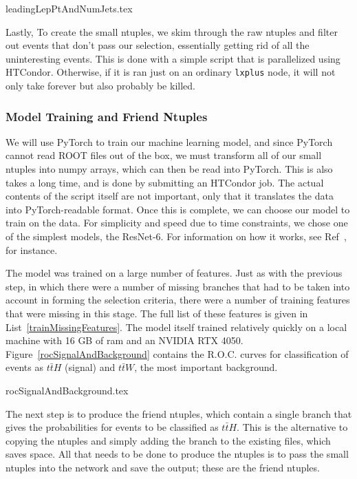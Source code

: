     {leadingLepPtAndNumJets.tex}

    Lastly, To create the small ntuples, we skim through the raw ntuples and filter out events that don't pass our selection, essentially getting rid of all the uninteresting events. This is done with a simple script that is parallelized using HTCondor. Otherwise, if it is ran just on an ordinary \texttt{lxplus} node, it will not only take forever but also probably be killed.


\subsubsection{Model Training and Friend Ntuples}
    We will use PyTorch to train our machine learning model, and since PyTorch cannot read ROOT files out of the box, we must transform all of our small ntuples into numpy arrays, which can then be read into PyTorch. This is also takes a long time, and is done by submitting an HTCondor job. The actual contents of the script itself are not important, only that it translates the data into PyTorch-readable format. Once this is complete, we can choose our model to train on the data. For simplicity and speed due to time constraints, we chose one of the simplest models, the ResNet-6. For information on how it works, see Ref~\cite{resnet}, for instance.

    The model was trained on a large number of features. Just as with the previous step, in which there were a number of missing branches that had to be taken into account in forming the selection criteria, there were a number of training features that were missing in this stage. The full list of these features is given in List~\ref{trainMissingFeatures}. The model itself trained relatively quickly on a local machine with 16 GB of ram and an NVIDIA RTX 4050. Figure~\ref{rocSignalAndBackground} contains the R.O.C. curves for classification of events as $t\bar{t}H$ (signal) and $t\bar{t}W$, the most important background.

    {rocSignalAndBackground.tex}

    The next step is to produce the friend ntuples, which contain a single branch that gives the probabilities for events to be classified as $t\bar{t}H$. This is the alternative to copying the ntuples and simply adding the branch to the existing files, which saves space. All that needs to be done to produce the ntuples is to pass the small ntuples into the network and save the output; these are the friend ntuples.



